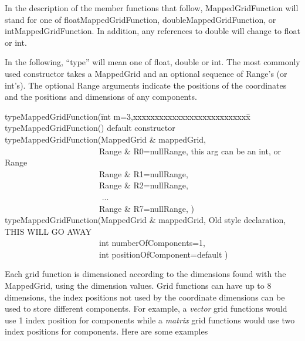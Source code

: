 In the description of the member functions that follow, {\ff MappedGridFunction}
will stand for one of {\ff floatMappedGridFunction}, {\ff doubleMappedGridFunction},
or {\ff intMappedGridFunction}. In addition, any references to {\ff double} will change to
{\ff float} or {\ff int}.





In the following, ``{\ff type}'' will mean one of {\ff float}, {\ff double} or {\ff int}.
The most commonly used constructor takes a {\ff MappedGrid} and an optional 
sequence of Range's (or int's).
The optional {\ff Range} arguments indicate the positions of the 
coordinates and the positions and dimensions of any components.
\begin{tabbing}
{\ff typeMappedGridFunction(}\={\ff int m=3,xxxxxxxxxxxxxxxxxxxxxxxxxxx}\= \kill
{\ff typeMappedGridFunction()}\>\> default constructor \\
{\ff typeMappedGridFunction(MappedGrid \& mappedGrid, }\> \\
{\ff ~~~~~~~~~~~~~~~~~~~~~~~Range \& R0=nullRange,}\> \>this arg can be an int, or Range \\
{\ff ~~~~~~~~~~~~~~~~~~~~~~~Range \& R1=nullRange,}\> \\
{\ff ~~~~~~~~~~~~~~~~~~~~~~~Range \& R2=nullRange,}\> \\
{\ff ~~~~~~~~~~~~~~~~~~~~~~~  ...         }\> \\
{\ff ~~~~~~~~~~~~~~~~~~~~~~~Range \& R7=nullRange, )  }\> \\
{\ff typeMappedGridFunction(MappedGrid \& mappedGrid, }\> \> Old style declaration, THIS WILL GO AWAY\\
{\ff ~~~~~~~~~~~~~~~~~~~~~~~int numberOfComponents=1,  }\> \\
{\ff ~~~~~~~~~~~~~~~~~~~~~~~int positionOfComponent=default )  }\> \\
\end{tabbing}
Each grid function is dimensioned according to the dimensions found
with the {\ff MappedGrid}, using the {\ff dimension} values.
Grid functions can have up to 8 dimensions, the index positions
not used by the coordinate dimensions can be used to store
different components. For example, a {\em vector} grid
functions would use 1 index position for components while a {\em matrix} grid functions would
use two index positions for components. 
Here are some examples
